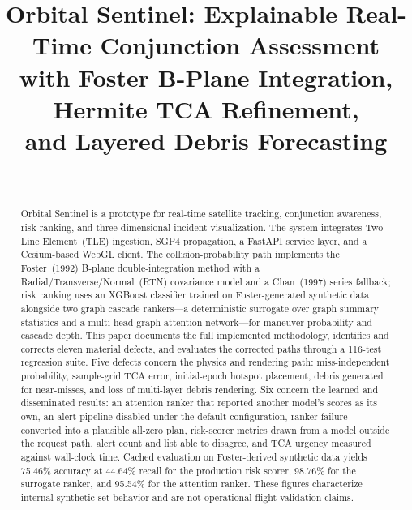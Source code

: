 \documentclass[conference]{IEEEtran}
\begin{document}
\title{Orbital Sentinel: Explainable Real-Time Conjunction Assessment\\
with Foster B-Plane Integration, Hermite TCA Refinement,\\
and Layered Debris Forecasting}

\author{%
  \\
}

\maketitle

\begin{abstract}
Orbital Sentinel is a prototype for real-time satellite tracking, conjunction
awareness, risk ranking, and three-dimensional incident visualization. The system
integrates Two-Line Element~(TLE) ingestion, SGP4 propagation, a FastAPI service
layer, and a Cesium-based WebGL client. The collision-probability path implements
the Foster~(1992) B-plane double-integration method with a
Radial/Transverse/Normal~(RTN) covariance model and a Chan~(1997) series fallback;
risk ranking uses an XGBoost classifier trained on Foster-generated synthetic data
alongside two graph cascade rankers---a deterministic surrogate over graph summary
statistics and a multi-head graph attention network---for maneuver probability and
cascade depth. This paper documents the full implemented methodology, identifies
and corrects eleven material defects, and evaluates the corrected paths through a
116-test regression suite. Five defects concern the physics and rendering path:
miss-independent probability, sample-grid TCA error, initial-epoch hotspot
placement, debris generated for near-misses, and loss of multi-layer debris
rendering. Six concern the learned and disseminated results: an attention ranker
that reported another model's scores as its own, an alert pipeline disabled under
the default configuration, ranker failure converted into a plausible all-zero
plan, risk-scorer metrics drawn from a model outside the request path, alert
count and list able to disagree, and TCA urgency measured against wall-clock
time. Cached evaluation on Foster-derived synthetic data yields 75.46\% accuracy
at 44.64\% recall for the production risk scorer, 98.76\% for the surrogate ranker,
and 95.54\% for the attention ranker. These figures characterize internal
synthetic-set behavior and are not operational flight-validation claims.
\end{abstract}
\end{document}
